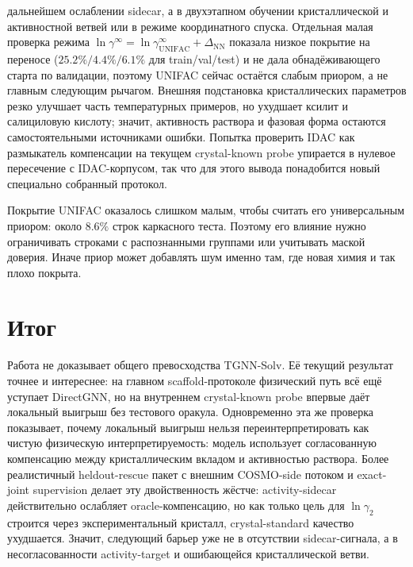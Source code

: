 \documentclass[11pt]{article}
\theoremstyle{definition}
\begin{document}
дальнейшем ослаблении sidecar, а в двухэтапном обучении кристаллической и активностной ветвей или в режиме координатного спуска. Отдельная малая проверка режима $\ln\gamma^\infty=\ln\gamma^\infty_{\mathrm{UNIFAC}}+\Delta_{\mathrm{NN}}$ показала низкое покрытие на переносе ($25.2\%/4.4\%/6.1\%$ для train/val/test) и не дала обнадёживающего старта по валидации, поэтому UNIFAC сейчас остаётся слабым приором, а не главным следующим рычагом. Внешняя подстановка кристаллических параметров резко улучшает часть температурных примеров, но ухудшает ксилит и салициловую кислоту; значит, активность раствора и фазовая форма остаются самостоятельными источниками ошибки. Попытка проверить IDAC как размыкатель компенсации на текущем crystal-known probe упирается в нулевое пересечение с IDAC-корпусом, так что для этого вывода понадобится новый специально собранный протокол.

Покрытие UNIFAC оказалось слишком малым, чтобы считать его универсальным приором: около $8.6\%$ строк каркасного теста. Поэтому его влияние нужно ограничивать строками с распознанными группами или учитывать маской доверия. Иначе приор может добавлять шум именно там, где новая химия и так плохо покрыта.

\section{Итог}

Работа не доказывает общего превосходства TGNN-Solv. Её текущий результат точнее и интереснее: на главном scaffold-протоколе физический путь всё ещё уступает DirectGNN, но на внутреннем crystal-known probe впервые даёт локальный выигрыш без тестового оракула. Одновременно эта же проверка показывает, почему локальный выигрыш нельзя переинтерпретировать как чистую физическую интерпретируемость: модель использует согласованную компенсацию между кристаллическим вкладом и активностью раствора. Более реалистичный heldout-rescue пакет с внешним COSMO-side потоком и exact-joint supervision делает эту двойственность жёстче: activity-sidecar действительно ослабляет oracle-компенсацию, но как только цель для $\ln\gamma_2$ строится через экспериментальный кристалл, crystal-standard качество ухудшается. Значит, следующий барьер уже не в отсутствии sidecar-сигнала, а в несогласованности activity-target и ошибающейся кристаллической ветви.
\end{document}
